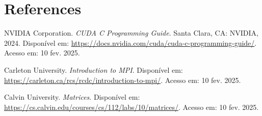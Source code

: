 \section{References}

\noindent NVIDIA Corporation. \textit{CUDA C Programming Guide}. Santa Clara, CA: NVIDIA, 2024. Disponível em: \url{https://docs.nvidia.com/cuda/cuda-c-programming-guide/}. Acesso em: 10 fev. 2025.

\noindent Carleton University. \textit{Introduction to MPI}. Disponível em: \url{https://carleton.ca/rcs/rcdc/introduction-to-mpi/}. Acesso em: 10 fev. 2025.

\noindent Calvin University. \textit{Matrices}. Disponível em: \url{https://cs.calvin.edu/courses/cs/112/labs/10/matrices/}. Acesso em: 10 fev. 2025.
